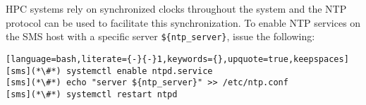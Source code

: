 HPC systems rely on synchronized clocks throughout the system and the
NTP protocol can be used to facilitate this synchronization. To enable NTP
services on the SMS host with a specific server \texttt{\$\{ntp\_server\}},
issue the following:

\begin{lstlisting}[language=bash,literate={-}{-}1,keywords={},upquote=true,keepspaces]
[sms](*\#*) systemctl enable ntpd.service
[sms](*\#*) echo "server ${ntp_server}" >> /etc/ntp.conf
[sms](*\#*) systemctl restart ntpd
\end{lstlisting}

